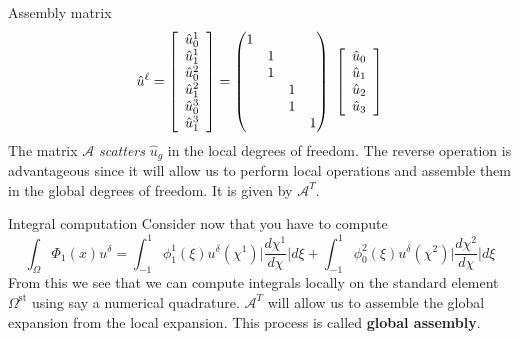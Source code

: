 \begin{frame}{Assembly matrix}
  \begin{equation}
    \label{eq:52}
    \hat{u}^\ell = \left[
      \begin{array}[c]{c}
        \hat{u}^1_0\\
        \hat{u}^1_1\\
        \hat{u}^2_0\\
        \hat{u}^2_1\\
        \hat{u}^3_0\\
        \hat{u}^3_1\\
      \end{array} \right]
    = 
    \begin{pmatrix}
      1 & & &\\
      & 1 & &\\
      & 1 & &\\
      &  & 1 &\\
      &  & 1 &\\
      &  &  & 1 \\
    \end{pmatrix}
    \ 
    \left[\begin{array}[c]{c}
        \hat{u}_0\\
        \hat{u}_1\\
        \hat{u}_2\\
        \hat{u}_3\\
      \end{array} \right]
  \end{equation}
  The matrix $\mathcal{A}$ \emph{scatters} $\hat{u}_g$ in the local
  degrees of freedom. The reverse operation is advantageous since it
  will allow us to perform local operations and assemble them in the
  global degrees of freedom. It is given by $\mathcal{A}^T$.
\end{frame}

\begin{frame}{Integral computation}
  Consider now that you have to compute 
  \begin{equation}
    \label{eq:53}
    \int_\Omega \Phi_1(x) u^\delta = \int_{-1}^1 \phi^1_1(\xi) u^\delta(\chi^1) \Big|\frac{d \chi^1}{d \chi}\Big| d\xi + \int_{-1}^1 \phi^2_0(\xi) u^\delta(\chi^2) \Big|\frac{d \chi^2}{d \chi}\Big| d\xi
  \end{equation}
  From this we see that we can compute integrals locally on the
  standard element $\Omega^{\text{st}}$ using say a numerical
  quadrature. $\mathcal{A}^T$ will allow us to assemble the global
  expansion from the local expansion. This process is called
  \textbf{global assembly}.
\end{frame}

